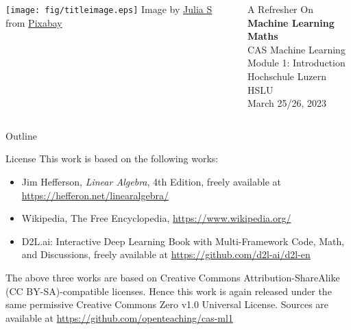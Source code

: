 \documentclass[9pt,aspectratio=169,xcolor=dvipsnames]{beamer}
\begin{document}
\begin{frame}
    \begin{columns}[onlytextwidth]
        \begin{column}{0.4\textwidth}
            \vspace*{10mm}
            \texttt{[image: fig/titleimage.eps]}
            {\tiny Image by \href{https://pixabay.com/users/julia_s-4109630/}{Julia S} from
                \href{https://pixabay.com}{Pixabay}}
        \end{column}
        \begin{column}{0.6\textwidth}
            \flushright
            {A Refresher On}\\[1mm]
            {\Huge \textbf{Machine Learning Maths}}\\[15mm]
            {\Large CAS Machine Learning}\\[1mm]
            {\Large Module 1: Introduction}\\[15mm]
            Hochschule Luzern HSLU\\[1mm]
            {March 25/26, 2023}\\
        \end{column}
    \end{columns}
\end{frame}

\begin{frame}{Outline}
    \tableofcontents
\end{frame}






% 
% 

\begin{frame}{License}
    \small
    This work is based on the following works:
    \begin{itemize}
        \item Jim Hefferson, \emph{Linear Algebra}, 4th Edition, freely available at \url{https://hefferon.net/linearalgebra/}
        \item Wikipedia, The Free Encyclopedia, \url{https://www.wikipedia.org/}
        \item D2L.ai: Interactive Deep Learning Book with Multi-Framework Code, Math, and Discussions, freely available at \url{https://github.com/d2l-ai/d2l-en}
    \end{itemize}

    The above three works are based on Creative Commons Attribution-ShareAlike (CC BY-SA)-compatible licenses. Hence this work is again released under 
    the same permissive Creative Commons Zero v1.0 Universal License. Sources are available at \url{https://github.com/openteaching/cas-ml1}
\end{frame}
\end{document}
